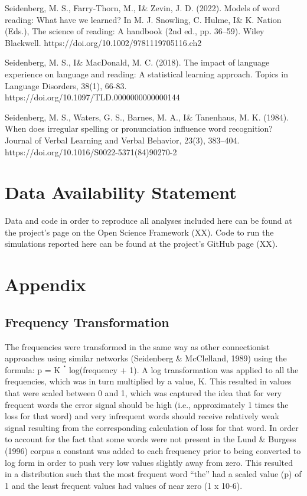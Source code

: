 \documentclass[
  ,man,floatsintext]{apa6}
\begin{document}
\begin{hangparas}{1.5em}{1}
Seidenberg, M. S., Farry-Thorn, M., I\& Zevin, J. D. (2022). Models of word reading: What have we learned? In M. J. Snowling, C. Hulme, I\& K. Nation (Eds.), The science of reading: A handbook (2nd ed., pp. 36–59). Wiley Blackwell. https://doi.org/10.1002/9781119705116.ch2

Seidenberg, M. S., I\& MacDonald, M. C. (2018). The impact of language experience on language and reading: A statistical learning approach. Topics in Language Disorders, 38(1), 66-83. https://doi.org/10.1097/TLD.0000000000000144

Seidenberg, M. S., Waters, G. S., Barnes, M. A., I\& Tanenhaus, M. K. (1984). When does irregular spelling or pronunciation influence word recognition? Journal of Verbal Learning and Verbal Behavior, 23(3), 383–404. https://doi.org/10.1016/S0022-5371(84)90270-2

\end{hangparas}

\hypertarget{data-availability-statement}{%
\section{Data Availability Statement}\label{data-availability-statement}}

Data and code in order to reproduce all analyses included here can be found at the project's page on the Open Science Framework (XX). Code to run the simulations reported here can be found at the project's GitHub page (XX).

\hypertarget{appendix}{%
\section{Appendix}\label{appendix}}

\hypertarget{frequency-transformation}{%
\subsection{Frequency Transformation}\label{frequency-transformation}}

The frequencies were transformed in the same way as other connectionist approaches using similar networks (Seidenberg \& McClelland, 1989) using the formula: p = K ॱ log(frequency + 1). A log transformation was applied to all the frequencies, which was in turn multiplied by a value, K. This resulted in values that were scaled between 0 and 1, which was captured the idea that for very frequent words the error signal should be high (i.e., approximately 1 times the loss for that word) and very infrequent words should receive relatively weak signal resulting from the corresponding calculation of loss for that word. In order to account for the fact that some words were not present in the Lund \& Burgess (1996) corpus a constant was added to each frequency prior to being converted to log form in order to push very low values slightly away from zero. This resulted in a distribution such that the most frequent word ``the'' had a scaled value (p) of 1 and the least frequent values had values of near zero (1 x 10-6).
\end{document}
